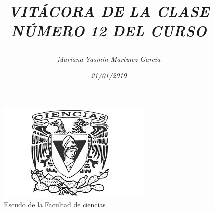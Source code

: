\documentclass{article}
\title{\Huge\item\color{purple}\textit{VITÁCORA DE LA CLASE NÚMERO 12 DEL CURSO}}
\author{\Large\textit{ Mariana Yasmin Martínez García}}
\date{\Large\textit{ 21/01/2019}}
\begin{document}
\begin{figure}[t]
	\centering
	\includegraphics[width=0.8\linewidth]{Imagenes/1}
	\caption{Escudo de la Facultad de ciencias}
	\label{fig:1}
\end{figure}
	\maketitle
		
	\newpage
	
\end{document}
